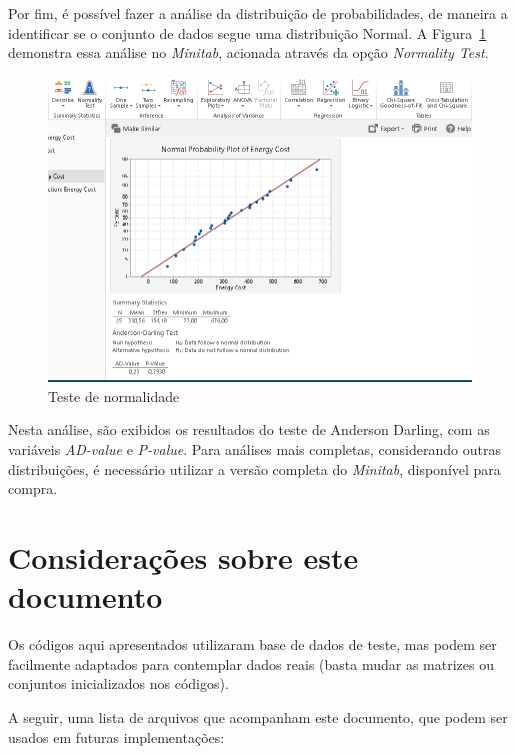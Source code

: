 \documentclass{article}
\begin{document}
Por fim, é possível fazer a análise da distribuição de probabilidades, de maneira a identificar se o conjunto de dados segue uma distribuição Normal. A Figura~\ref{fig:probanalises} demonstra essa análise no \emph{Minitab}, acionada através da opção \textit{Normality Test}.

\begin{figure}[!h]
    \centering
    \includegraphics[scale=0.75]{probanalise.png}
    \caption{Teste de normalidade}
    \label{fig:probanalises}
\end{figure}

Nesta análise, são exibidos os resultados do teste de Anderson Darling, com as variáveis \emph{AD-value} e \emph{P-value}. Para análises mais completas, considerando outras distribuições, é necessário utilizar a versão completa do \emph{Minitab}, disponível para compra.


\section{Considerações sobre este documento}

Os códigos aqui apresentados utilizaram base de dados de teste, mas podem ser facilmente adaptados para contemplar dados reais (basta mudar as matrizes ou conjuntos inicializados nos códigos).

A seguir, uma lista de arquivos que acompanham este documento, que podem ser usados em futuras implementações:
\end{document}
